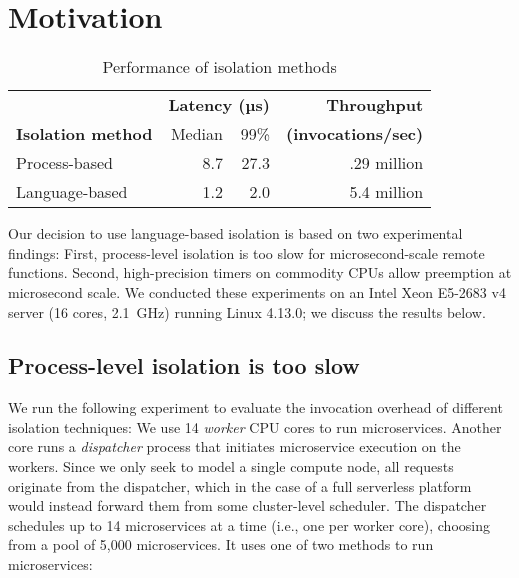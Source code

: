 \section{Motivation}
\label{sec:motive}

\begin{table}
\begin{center}
\small
\begin{tabular}{lrrr}
   & \multicolumn{2}{c}{\textbf{Latency (µs)}} & \textbf{Throughput} \\
  \textbf{Isolation method} & Median & 99\% & \textbf{(invocations/sec)} \\
\midrule
Process-based & 8.7 & 27.3 & .29 million \\
Language-based & 1.2 & 2.0 & 5.4 million \\
\end{tabular}
\caption{Performance of isolation methods}
\label{tab:isolation_methods}
\end{center}
\end{table}

Our decision to use language-based isolation is based on two experimental
findings:  First, process-level isolation is too slow for
microsecond-scale remote functions. Second, high-precision timers on commodity
CPUs allow preemption at microsecond scale.  We conducted these experiments
on an Intel Xeon E5-2683 v4 server (16 cores, 2.1~GHz) running
Linux 4.13.0; we discuss the results below.

\subsection{Process-level isolation is too slow}
We run the following experiment to evaluate the invocation overhead of different
isolation techniques: We use 14 \emph{worker} CPU cores to run microservices. Another
core runs a \emph{dispatcher} process that initiates microservice execution on the
workers.  Since we only seek to model a single compute node, all requests originate
from the dispatcher, which in the case of a full serverless platform would instead
forward them from some cluster-level scheduler.  The dispatcher schedules up to 14
microservices at a time (i.e., one per worker core), choosing from a pool of 5,000
microservices. It uses one of two methods to run microservices:

